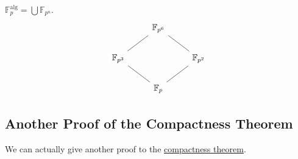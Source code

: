 \begin{note}
	\(\mathbb{F} _p^{\mathrm{alg} } = \bigcup \mathbb{F} _{p^n}\).
	\[\begin{tikzcd}
			& {\mathbb{F}_{p^6}} \\
			{\mathbb{F}_{p^3}} && {\mathbb{F}_{p^2}} \\
			& {\mathbb{F}_{p}}
			\arrow[no head, from=3-2, to=2-3]
			\arrow[no head, from=2-3, to=1-2]
			\arrow[no head, from=2-1, to=1-2]
			\arrow[no head, from=3-2, to=2-1]
		\end{tikzcd}\]
\end{note}

\subsection{Another Proof of the Compactness Theorem}
We can actually give another proof to the \hyperref[thm:compactness]{compactness theorem}.

